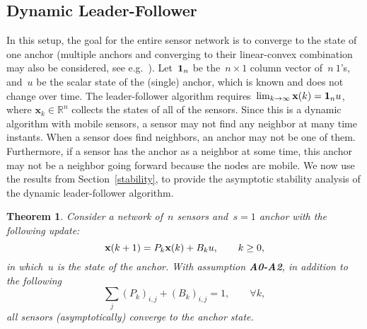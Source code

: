 \documentclass[draftclsnofoot, onecolumn, 12pt]{IEEEtran}
\newtheorem{thm}{Theorem}
\def\mb{\mathbf}
\def\mbb{\mathbb}
\begin{document}
\subsection{Dynamic Leader-Follower}
In this setup, the goal for the entire sensor network is to converge to the state of one anchor (multiple anchors and converging to their linear-convex combination may also be considered, see e.g.~\cite{khan2009distributed,khan2010diland}). Let~${\bf{1}}_{n}$ be the~$n \times 1$ column vector of~$n~1$’s, and~$u$ be the scalar state of the (single) anchor, which is known and does not change over time. The leader-follower algorithm requires~$\lim_{k \rightarrow \infty}{\bf{x}}(k) \nonumber = {\bf{1}}_{n}{{u}}$, where $\mb{x}_k\in\mbb{R}^n$ collects the states of all of the sensors. Since this is a dynamic algorithm with mobile sensors, a sensor may not find any neighbor at many time instants. When a sensor does find neighbors, an anchor may not be one of them. Furthermore, if a sensor has the anchor as a neighbor at some time, this anchor may not be a neighbor going forward because the nodes are mobile. We now use the results from Section~\ref{stability}, to provide the asymptotic stability analysis of the dynamic leader-follower algorithm. 
\begin{thm}
Consider a network of~$n$ sensors and~$s=1$ anchor with the following update:
\begin{equation}\label{71}
{\bf{x}}(k+1)={{P}}_k{\bf{x}}(k)+{{B}}_k{{u}},\qquad k \geq 0,
\end{equation}
in which~$u$ is the state of the anchor. With assumption {\bf{A0-A2}}, in addition to the following
\begin{equation}\label{lf}
\sum_j ({P}_{k})_{i,j}+({B}_{k})_{i,j}=1, \qquad \forall k,
\end{equation}
all sensors (asymptotically) converge to the anchor state.
\end{thm}
\end{document}

